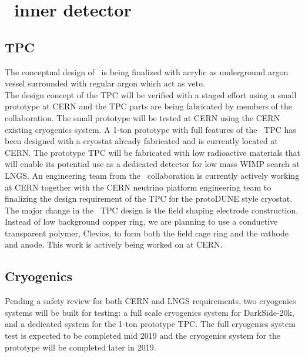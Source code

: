 \section{\DSk\ inner detector}
\label{sec:Inner-Cryogenics}

\subsection{TPC}
The conceptual design of \DSk\ is being finalized with acrylic as underground argon vessel surrounded with regular argon which act as veto. \\
 The design concept of the TPC will be verified with a staged effort using a small prototype at CERN and the TPC parts are being fabricated by members of the collaboration. The small prototype will be tested at CERN using the CERN existing cryogenics system.  A 1-ton prototype with full features of the \DSk\ TPC has been designed with a cryostat already fabricated and is currently located at CERN. The prototype TPC will be fabricated with low radioactive materials that will enable its potential use as a dedicated detector for low mass WIMP search at LNGS.  An engineering team from the \DSk\ collaboration is currently actively working at CERN together with the CERN neutrino platform engineering team to finalizing the design requirement of the TPC for the protoDUNE style cryostat. \\
The major change in the \DSk\ TPC design is the field shaping electrode construction. Instead of low background copper ring, we are planning to use a conductive transparent polymer, Clevios, to form both the field cage ring and the cathode and anode. This work is actively being worked on at CERN.

\subsection{Cryogenics}

Pending a safety review for both CERN and LNGS requirements, two cryogenics systems will be built for testing: a  full scale cryogenics system for DarkSide-20k, and a dedicated system for the 1-ton prototype TPC. The full cryogenics system test is expected to be completed mid 2019 and the cryogenics system for the prototype will be completed later in 2019.









